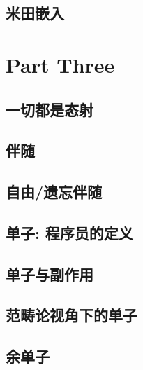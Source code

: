 \chapter{米田嵌入}\label{yoneda-embedding}


\part*{Part Three}

\chapter{一切都是态射}\label{all-about-morphisms}


\chapter{伴随}\label{adjunctions}


\chapter{自由/遗忘伴随}\label{free-forgetful-adjunctions}


\chapter{单子: 程序员的定义}\label{monads-programmers-definition}


\chapter{单子与副作用}\label{monads-and-effects}


\chapter{范畴论视角下的单子}\label{monads-categorically}


\chapter{余单子}\label{comonads}


